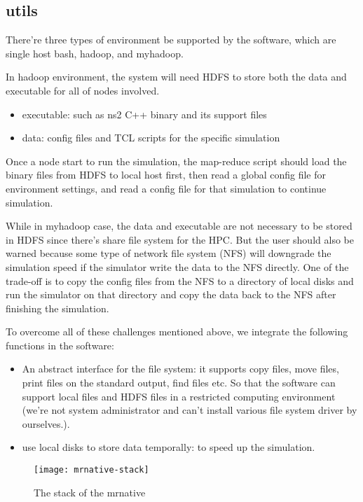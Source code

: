 \subsection{utils}

There're three types of environment be supported by the software,
which are single host bash, hadoop, and myhadoop.

In hadoop environment, the system will need HDFS to store both the data and executable for all of nodes involved.
\begin{itemize}
  \item executable: such as ns2 C++ binary and its support files
  \item data: config files and TCL scripts for the specific simulation
\end{itemize}
Once a node start to run the simulation, the map-reduce script should load the binary files from HDFS to local host first,
then read a global config file for environment settings,
and read a config file for that simulation to continue simulation.

While in myhadoop case, the data and executable are not necessary to be stored in HDFS since there's share file system for the HPC.
But the user should also be warned because some type of network file system (NFS) will downgrade the simulation speed if the simulator write the data to the NFS directly.
One of the trade-off is to copy the config files from the NFS to a directory of local disks and run the simulator on that directory and copy the data back to the NFS after finishing the simulation.

To overcome all of these challenges mentioned above,
we integrate the following functions in the software:
\begin{itemize}
  \item An abstract interface for the file system: it supports copy files, move files, print files on the standard output, find files etc. So that the software can support local files and HDFS files in a restricted computing environment (we're not system administrator and can't install various file system driver by ourselves.).
  \item use local disks to store data temporally: to speed up the simulation.
\end{itemize}

\begin{figure}\centering
  \texttt{[image: mrnative-stack]}
  \caption{The stack of the mrnative}\label{fig:mrnativestack}
\end{figure}

